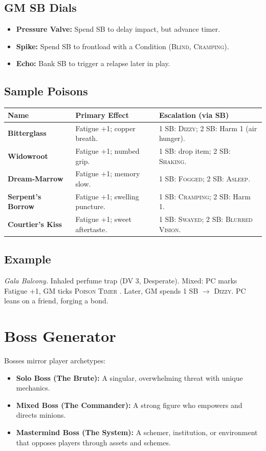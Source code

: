\subsection*{GM SB Dials}
\begin{itemize}
    \item \textbf{Pressure Valve:} Spend SB to delay impact, but advance timer.
    \item \textbf{Spike:} Spend SB to frontload with a Condition (\textsc{Blind}, \textsc{Cramping}).
    \item \textbf{Echo:} Bank SB to trigger a relapse later in play.
\end{itemize}

\subsection*{Sample Poisons}
\begin{tabularx}{\linewidth}{>{\bfseries}l X X}
\toprule
Name & Primary Effect & Escalation (via SB) \\
\midrule
Bitterglass & Fatigue +1; copper breath. & 1 SB: \textsc{Dizzy}; 2 SB: Harm 1 (air hunger). \\
Widowroot & Fatigue +1; numbed grip. & 1 SB: drop item; 2 SB: \textsc{Shaking}. \\
Dream‑Marrow & Fatigue +1; memory slow. & 1 SB: \textsc{Fogged}; 2 SB: \textsc{Asleep}. \\
Serpent's Borrow & Fatigue +1; swelling puncture. & 1 SB: \textsc{Cramping}; 2 SB: Harm 1. \\
Courtier's Kiss & Fatigue +1; sweet aftertaste. & 1 SB: \textsc{Swayed}; 2 SB: \textsc{Blurred Vision}. \\
\bottomrule
\end{tabularx}

\subsection*{Example}
\emph{Gala Balcony.} Inhaled perfume trap (DV 3, Desperate). Mixed: PC marks Fatigue +1, GM ticks \textsc{Poison Timer }. Later, GM spends 1 SB $\to$ \textsc{Dizzy}. PC leans on a friend, forging a bond.

\newpage
\section{Boss Generator}\label{sec:boss_generator}

Bosses mirror player archetypes:
\begin{itemize}
    \item \textbf{Solo Boss (The Brute):} A singular, overwhelming threat with unique mechanics.
    \item \textbf{Mixed Boss (The Commander):} A strong figure who empowers and directs minions.
    \item \textbf{Mastermind Boss (The System):} A schemer, institution, or environment that opposes players through assets and schemes.
\end{itemize}

